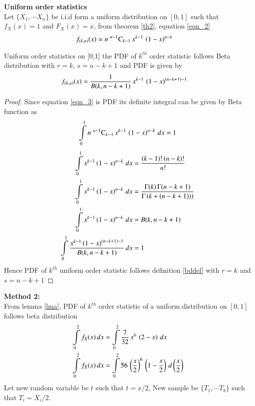 \documentclass[journal,12pt,twocolumn]{IEEEtran}
\begin{document}
\begin{definition}
\textbf{Uniform order statistics} \\
Let $\{X_1,\cdots X_n\}$ be i.i.d form a uniform distribution on $[0,1]$ such that $f_{X}(x) = 1$ and $F_{X}(x)=x$,
from theorem \eqref{th2}, equation \eqref{eqn_2}
\begin{align}
f_{(k,n)}(x) &= n\;{}^{n-1}\mathrm{C}_{k-1}\,x^{k-1}\,\left(1-x\right)^{n-k}\label{eqn_3}
\end{align}
\end{definition}

\begin{lemma}
\label{lma}
Uniform order statistics on [0,1] the PDF of $k^{th}$ order statistic follows Beta distribution with $r=k$, $s=n-k+1$
and  PDF is given by 
\begin{align}
f_{(k,n)}(x) &= \dfrac{1}{B(k,n-k+1)}\,x^{k-1}\,\left(1-x\right)^{(n-k+1)-1} 
\end{align}
\end{lemma}
\newpage

\begin{proof}
Since equation \eqref{eqn_3} is PDF its definite integral can be given by Beta function as
\begin{equation}
 \int\limits_{0}^{1} n\;{}^{n-1}\mathrm{C}_{k-1}\,x^{k-1}\,\left(1-x\right)^{n-k} \,dx  = 1    
\end{equation}
\begin{align}
\int\limits_{0}^{1} x^{k-1}\left(1-x\right)^{n-k} \,dx  &= \dfrac{(k-1)!\,(n-k)!}{n!}  \\
\int\limits_{0}^{1} x^{k-1}\left(1-x\right)^{n-k} \,dx  &= \dfrac{\Gamma(k)\,\Gamma(n-k+1)}{\Gamma\left(k+(n-k+1))\right)} \\
\int\limits_{0}^{1} x^{k-1}\left(1-x\right)^{n-k} \,dx  &= B(k,n-k+1) \\
\int\limits_{0}^{1} \dfrac{x^{k-1}\left(1-x\right)^{(n-k+1)-1}}{B(k,n-k+1)}\,dx  &= 1
\end{align}
Hence PDF of $k^{th}$ uniform order statistic follows definition \eqref{bddef}   with $r=k$ and $s=n-k+1$
\end{proof}

\textbf{Method 2:}\\
From lemma \eqref{lma}, PDF of $k^{th}$ order statistic of a uniform distribution on $[0,1]$ follows 
beta distribution
\begin{align}
\int\limits_{0}^{2}f_{X}(x)\,dx &= \int\limits_{0}^{2} \dfrac{7}{32}\,x^{6}\,\left(2-x\right)\,dx \\
\int\limits_{0}^{2}f_{X}(x)\,dx &= \int\limits_{0}^{2} 56\,\left(\dfrac{x}{2}\right)^{6}\,\left(1-\dfrac{x}{2}\right)\,d\left(\dfrac{x}{2}\right)
\end{align}
Let new random variable be $t$ such that $t=x/2$, New sample be $\{T_1,\cdots T_8\}$ such that $T_{i}=X_{i}/2$.
\end{document}
